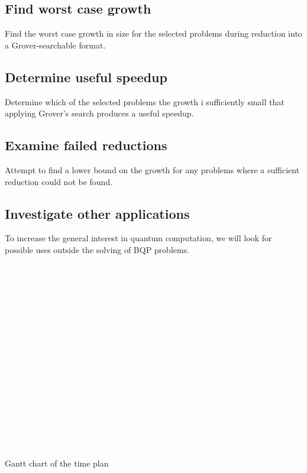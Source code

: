 \documentclass[msc,lith,english]{liuthesis}
\begin{document}
\subsection{Find worst case growth}
Find the worst case growth in size for the selected problems during reduction into a Grover-searchable format.

\subsection{Determine useful speedup}
Determine which of the selected problems the growth i sufficiently small that applying Grover's search produces a useful speedup.

\subsection{Examine failed reductions}
Attempt to find a lower bound on the growth for any problems where a sufficient reduction could not be found.

\subsection{Investigate other applications}
To increase the general interest in quantum computation, we will look for possible uses outside the solving of BQP problems.

\begin{table}
  \begin{ganttchart}{1}{23}
     \\
     \\
     \\
     \\
     \\
     \\
     \\

     \\

     \\
     \\

     \\
     \\
     \\
     \\
     \\
     \\
  \end{ganttchart}
  \caption{Gantt chart of the time plan}\label{gantt}
\end{table}
\end{document}
